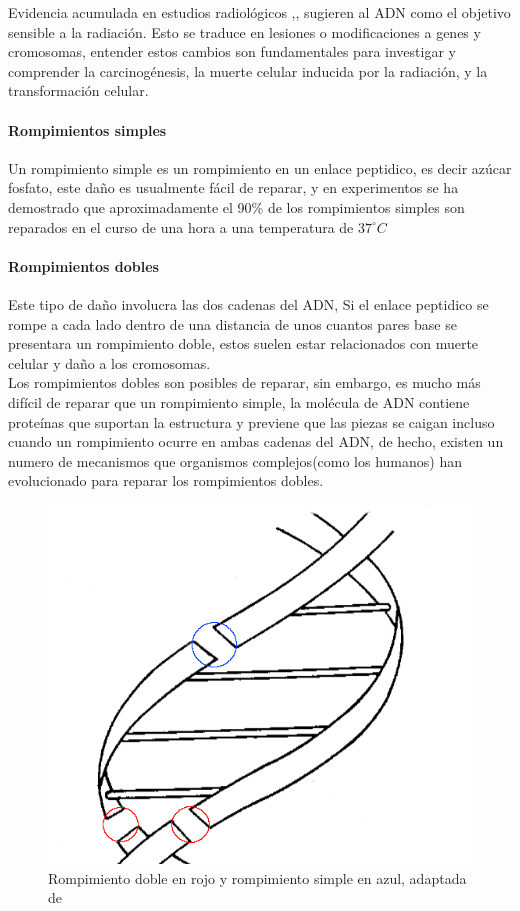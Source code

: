 Evidencia acumulada en estudios radiológicos \cite{Franklin},\cite{rescells},  sugieren al ADN como el  objetivo sensible a la radiación. Esto se traduce en lesiones o modificaciones a genes y cromosomas, entender estos cambios son fundamentales para investigar y comprender la carcinogénesis, la muerte celular inducida por la radiación, y la transformación celular.\\


\paragraph{Rompimientos simples}
Un rompimiento simple es un rompimiento en un enlace peptidico, es decir azúcar fosfato, este daño es usualmente fácil de reparar, y en experimentos  se ha demostrado que aproximadamente el 90\% de los rompimientos simples son reparados en el curso de una hora a una temperatura de $37^{\circ} C$ \cite{Thormod}

\paragraph{Rompimientos dobles}

Este tipo de daño involucra las dos cadenas  del ADN, Si el enlace peptidico se rompe a cada lado dentro de una distancia de unos cuantos pares base se presentara un rompimiento doble, estos suelen estar relacionados con muerte celular y daño a los cromosomas.\\
Los rompimientos dobles son posibles de reparar, sin embargo, es mucho más difícil de reparar que un rompimiento simple,
la molécula de ADN contiene proteínas que suportan la estructura y previene que las piezas se caigan incluso cuando un rompimiento ocurre en ambas cadenas del ADN, de hecho, existen un numero de mecanismos que organismos complejos(como los humanos) han evolucionado para reparar los rompimientos dobles\cite{Thormod}.

\begin{figure}[htbp]
    \centering
    \includegraphics[width=0.5\linewidth]{./Figures/esbdb.png}
    \caption[Esquema rompimientos simples y dobles]{Rompimiento doble en rojo y rompimiento simple en azul, adaptada de \cite{Thormod}}
    \label{fig:esbdb}
\end{figure}


